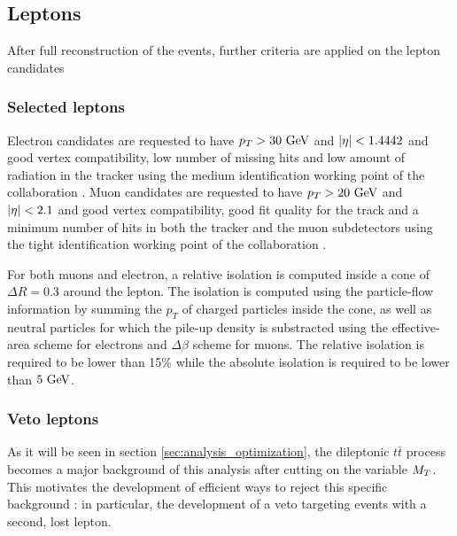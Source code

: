         \subsection{Leptons}

        After full reconstruction of the events, further criteria are applied on the lepton candidates 

            \subsubsection{Selected leptons}

        Electron candidates are requested to have $p_T > 30 ~\text{GeV}$ and $\left| \eta \right| < 1.4442$ and good vertex compatibility,
        low number of missing hits and low amount of radiation in the tracker using the medium identification working point
        of the collaboration . Muon candidates are requested to have $p_T > 20 ~\text{GeV}$ and $\left| \eta \right| < 2.1$
        and good vertex compatibility, good fit quality for the track and a minimum number of hits in both the tracker
        and the muon subdetectors using the tight identification working point of the collaboration .

        For both muons and electron, a relative isolation is computed inside a cone of $\Delta R = 0.3$ around the lepton.
        The isolation is computed using the particle-flow information by summing the $p_T$ of charged particles inside
        the cone, as well as neutral particles for which the pile-up density is substracted using the effective-area 
        scheme for electrons and $\Delta \beta$ scheme for muons. The relative isolation is required to be lower than
        15\% while the absolute isolation is required to be lower than $5 ~\text{GeV}$.

        \subsubsection{Veto leptons \label{sec:vetoLeptons}}

        As it will be seen in section \ref{sec:analysis_optimization}, the dileptonic $t\bar{t}$ process becomes a major
        background of this analysis after cutting on the variable $M_T$. This motivates the development of efficient ways
        to reject this specific background : in particular, the development of a veto targeting events with a second, lost 
        lepton.

